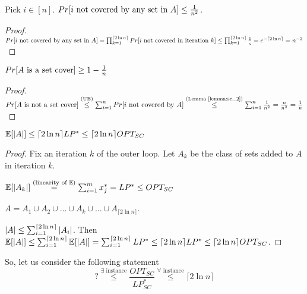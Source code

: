     \begin{lemma}\label{lemma:sc_2}
        Pick $i \in [n]$. $Pr[i \text{ not covered by any set in } A] \leq \frac{1}{n^2}$.
    \end{lemma}

    \begin{proof}
        $Pr[i \text{ not covered by any set in } A] = \prod_{k=1}^{\lceil 2 \ln n \rceil} Pr[i \text{ not covered in iteration } k] \leq \prod_{k=1}^{\lceil 2 \ln n \rceil} \frac{1}{e} = e^{- \lceil 2 \ln n \rceil} = n^{-2} $ 
    \end{proof}

    \begin{lemma}
        $Pr[A \text{ is a set cover}] \geq 1 - \frac{1}{n}$
    \end{lemma}

    \begin{proof}
        $Pr[A \text{ is not a set cover}] \overset{\text{(UB)}}{\leq} \sum_{i=1}^n Pr[i \text{ not covered by } A] \overset{\text{(Lemma \ref{lemma:sc_2})}}{\leq} \sum_{i=1}^{n} \frac{1}{n^2} = \frac{n}{n^2} = \frac{1}{n}$
    \end{proof}

    \begin{lemma}
        $\mathbb{E}[\vert A \vert] \leq \lceil 2 \ln n \rceil LP^* \leq \lceil 2 \ln n \rceil OPT_{SC}$
    \end{lemma}

    \begin{proof}
        Fix an iteration $k$ of the outer loop. Let $A_k$ be the class of sets added to $A$ in iteration $k$.

        $\mathbb{E}[\vert A_k \vert] \overset{(\text{linearity of } \mathbb{E})}{=} \sum_{i=1}^{m} x_j^* = LP^* \leq OPT_{SC}$

        $A = A_1 \cup A_2 \cup \dots \cup A_k \cup \dots \cup A_{\lceil 2 \ln n \rceil}$.
        
        $\vert A \vert \leq \sum_{i = 1}^{\lceil 2 \ln n \rceil} \vert A_i \vert$. Then $\mathbb{E}[\vert A \vert] \leq \sum_{i=1}^{\lceil 2 \ln n \rceil} \mathbb{E}[\vert A \vert] = \sum_{i=1}^{\lceil 2 \ln n \rceil} LP^* \leq \lceil 2 \ln n \rceil LP^* \leq \lceil 2 \ln n \rceil OPT_{SC}$.
    \end{proof}

    So, let us consider the following statement
    \[ ? \overset{\exists \text{ instance}}{\leq} \frac{OPT_{SC}}{LP_{SC}^*} \overset{\forall \text{ instance}}{\leq} \lceil 2 \ln n \rceil \]


